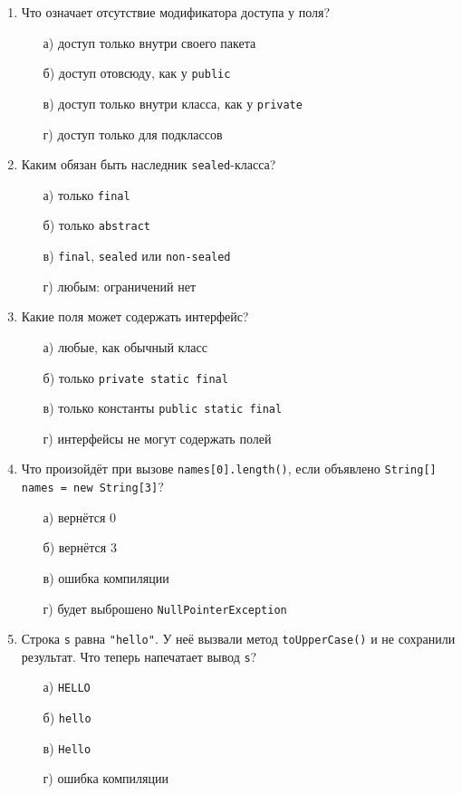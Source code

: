 \begin{enumerate}

\item Что означает отсутствие модификатора доступа у поля?
  \begin{enumerate}
    \item[а)] доступ только внутри своего пакета
    \item[б)] доступ отовсюду, как у \texttt{public}
    \item[в)] доступ только внутри класса, как у \texttt{private}
    \item[г)] доступ только для подклассов
  \end{enumerate}

\item Каким обязан быть наследник \texttt{sealed}-класса?
  \begin{enumerate}
    \item[а)] только \texttt{final}
    \item[б)] только \texttt{abstract}
    \item[в)] \texttt{final}, \texttt{sealed} или \texttt{non-sealed}
    \item[г)] любым: ограничений нет
  \end{enumerate}

\item Какие поля может содержать интерфейс?
  \begin{enumerate}
    \item[а)] любые, как обычный класс
    \item[б)] только \texttt{private static final}
    \item[в)] только константы \texttt{public static final}
    \item[г)] интерфейсы не могут содержать полей
  \end{enumerate}

\item Что произойдёт при вызове \texttt{names[0].length()}, если объявлено
      \texttt{String[] names = new String[3]}?
  \begin{enumerate}
    \item[а)] вернётся 0
    \item[б)] вернётся 3
    \item[в)] ошибка компиляции
    \item[г)] будет выброшено \texttt{NullPointerException}
  \end{enumerate}

\item Строка \texttt{s} равна \texttt{"hello"}. У неё вызвали метод
      \texttt{toUpperCase()} и не сохранили результат. Что теперь напечатает
      вывод \texttt{s}?
  \begin{enumerate}
    \item[а)] \texttt{HELLO}
    \item[б)] \texttt{hello}
    \item[в)] \texttt{Hello}
    \item[г)] ошибка компиляции
  \end{enumerate}


\end{enumerate}
